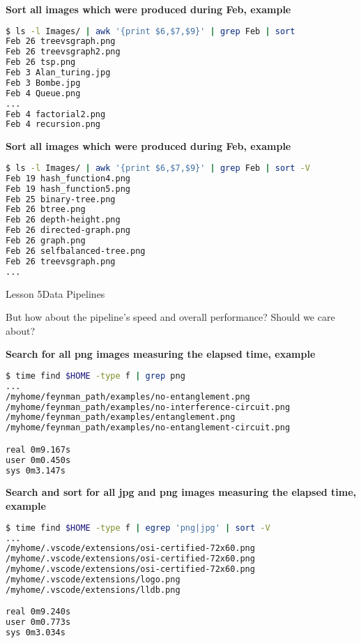 \documentclass[aspectratio=1610]{beamer}
\begin{document}
\begin{frame}[fragile]
\LARGE
\textbf{Sort all images which were produced during Feb, example}\\
\Large
\begin{lstlisting}[language=sh]
$ ls -l Images/ | awk '{print $6,$7,$9}' | grep Feb | sort
Feb 26 treevsgraph.png
Feb 26 treevsgraph2.png
Feb 26 tsp.png
Feb 3 Alan_turing.jpg
Feb 3 Bombe.jpg
Feb 4 Queue.png
...
Feb 4 factorial2.png
Feb 4 recursion.png
\end{lstlisting}
\end{frame}



\begin{frame}[fragile]
\LARGE
\textbf{Sort all images which were produced during Feb, example}\\
\Large
\begin{lstlisting}[language=sh]
$ ls -l Images/ | awk '{print $6,$7,$9}' | grep Feb | sort -V
Feb 19 hash_function4.png
Feb 19 hash_function5.png
Feb 25 binary-tree.png
Feb 26 btree.png
Feb 26 depth-height.png
Feb 26 directed-graph.png
Feb 26 graph.png
Feb 26 selfbalanced-tree.png
Feb 26 treevsgraph.png
...
\end{lstlisting}
\end{frame}


\begin{frame}{Lesson 5}{Data Pipelines}
\Huge
\begin{center}
But how about the pipeline's \alert{speed} and overall
\alert{performance}? Should we care about?
\end{center}
\end{frame}



\begin{frame}[fragile]
\LARGE
\textbf{Search for all png images measuring the elapsed time, example}\\
\Large
\begin{lstlisting}[language=sh]
$ time find $HOME -type f | grep png
...
/myhome/feynman_path/examples/no-entanglement.png
/myhome/feynman_path/examples/no-interference-circuit.png
/myhome/feynman_path/examples/entanglement.png
/myhome/feynman_path/examples/no-entanglement-circuit.png

real 0m9.167s
user 0m0.450s
sys 0m3.147s
\end{lstlisting}
\end{frame}



\begin{frame}[fragile]
\LARGE
\textbf{Search  and sort for all jpg and png images measuring the elapsed time, example}\\
\Large
\begin{lstlisting}[language=sh]
$ time find $HOME -type f | egrep 'png|jpg' | sort -V
...
/myhome/.vscode/extensions/osi-certified-72x60.png
/myhome/.vscode/extensions/osi-certified-72x60.png
/myhome/.vscode/extensions/osi-certified-72x60.png
/myhome/.vscode/extensions/logo.png
/myhome/.vscode/extensions/lldb.png

real 0m9.240s
user 0m0.773s
sys 0m3.034s
\end{lstlisting}
\end{frame}
\end{document}
